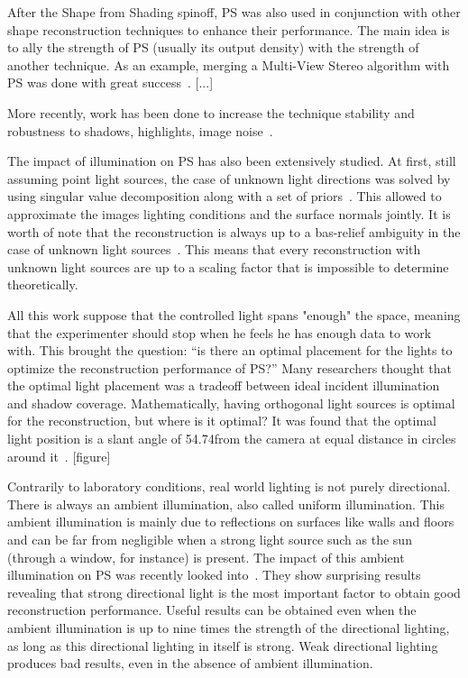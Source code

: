 \documentclass{report}
\begin{document}
After the Shape from Shading spinoff, PS was also used in conjunction with other shape reconstruction techniques to enhance their performance. The main idea is to ally the strength of PS (usually its output density) with the strength of another technique. As an example, merging a Multi-View Stereo algorithm with PS was done with great success~\cite{HernandezEsteban2008}.
[...]

More recently, work has been done to increase the technique stability and robustness to shadows, highlights, image noise~\cite{BarskyPetrou-pami-2003,ikehata-cvpr-12,ikehata-cvpr-14}.

The impact of illumination on PS has also been extensively studied. At first, still assuming point light sources, the case of unknown light directions was solved by using singular value decomposition along with a set of priors~\cite{Hayakawa1994}. This allowed to approximate the images lighting conditions and the surface normals jointly. It is worth of note that the reconstruction is always up to a bas-relief ambiguity in the case of unknown light sources~\cite{Belhumeur1999}. This means that every reconstruction with unknown light sources are up to a scaling factor that is impossible to determine theoretically.

All this work suppose that the controlled light spans "enough" the space, meaning that the experimenter should stop when he feels he has enough data to work with. This brought the question: ``is there an optimal placement for the lights to optimize the reconstruction performance of PS?'' Many researchers thought that the optimal light placement was a tradeoff between ideal incident illumination and shadow coverage. Mathematically, having orthogonal light sources is optimal for the reconstruction, but where is it optimal? It was found that the optimal light position is a slant angle of 54.74\degree from the camera at equal distance in circles around it~\cite{spence-iwtas-03,drbohlav-iccv-05}. [figure]

Contrarily to laboratory conditions, real world lighting is not purely directional. There is always an ambient illumination, also called uniform illumination. This ambient illumination is mainly due to reflections on surfaces like walls and floors and can be far from negligible when a strong light source such as the sun (through a window, for instance) is present. The impact of this ambient illumination on PS was recently looked into~\cite{Angelopoulou2013}. They show surprising results revealing that strong directional light is the most important factor to obtain good reconstruction performance. Useful results can be obtained even when the ambient illumination is up to nine times the strength of the directional lighting, as long as this directional lighting in itself is strong. Weak directional lighting produces bad results, even in the absence of ambient illumination.
\end{document}
